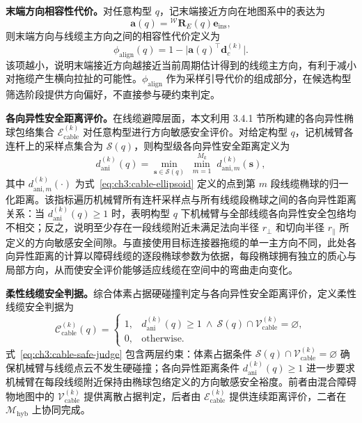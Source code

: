 \textbf{末端方向相容性代价。}对任意构型 $q$，记末端接近方向在地图系中的表达为
\begin{equation}
  \mathbf{a}(q)={}^{\mathcal{W}}\mathbf{R}_E(q)\mathbf{e}_{\mathrm{ins}},
\end{equation}
则末端方向与线缆主方向之间的相容性代价定义为
\begin{equation}
  \phi_{\mathrm{align}}(q)=1-\bigl|\mathbf{a}(q)^\top \mathbf{d}_c^{(k)}\bigr|.
  \label{eq:ch3:cable-align}
\end{equation}
该项越小，说明末端接近方向越接近当前周期估计得到的线缆主方向，有利于减小对拖缆产生横向拉扯的可能性。$\phi_{\mathrm{align}}$ 作为采样引导代价的组成部分，在候选构型筛选阶段提供方向偏好，不直接参与硬约束判定。

\textbf{各向异性安全距离评价。}在线缆避障层面，本文利用 3.4.1 节所构建的各向异性椭球包络集合 $\mathcal{E}_{\mathrm{cable}}^{(k)}$ 对任意构型进行方向敏感安全评价。对给定构型 $q$，记机械臂各连杆上的采样点集合为 $\mathcal{S}(q)$，则构型级各向异性安全距离定义为
\begin{equation}
  d_{\mathrm{ani}}^{(k)}(q)=\min_{\mathbf{s}\in\mathcal{S}(q)}\;\min_{m=1}^{M_k}\;d_{\mathrm{ani},m}^{(k)}(\mathbf{s}),
  \label{eq:ch3:cable-ani-q}
\end{equation}
其中 $d_{\mathrm{ani},m}^{(k)}(\cdot)$ 为式~\eqref{eq:ch3:cable-ellipsoid} 定义的点到第 $m$ 段线缆椭球的归一化距离。该指标遍历机械臂所有连杆采样点与所有线缆段椭球之间的各向异性距离关系：当 $d_{\mathrm{ani}}^{(k)}(q)\ge 1$ 时，表明构型 $q$ 下机械臂与全部线缆各向异性安全包络均不相交；反之，说明至少存在一段线缆附近未满足法向半径 $r_\perp$ 和切向半径 $r_\parallel$ 所定义的方向敏感安全间隙。与直接使用目标连接器拖缆的单一主方向不同，此处各向异性距离的计算以障碍线缆的逐段椭球参数为依据，每段椭球拥有独立的质心与局部方向，从而使安全评价能够适应线缆在空间中的弯曲走向变化。

\textbf{柔性线缆安全判据。}综合体素占据硬碰撞判定与各向异性安全距离评价，定义柔性线缆安全判据为
\begin{equation}
  \mathcal{C}_{\mathrm{cable}}^{(k)}(q)=
  \begin{cases}
    1,& d_{\mathrm{ani}}^{(k)}(q)\ge 1\ \land\ \mathcal{S}(q)\cap\mathcal{V}_{\mathrm{cable}}^{(k)}=\varnothing,\\
    0,& \text{otherwise}.
  \end{cases}
  \label{eq:ch3:cable-safe-judge}
\end{equation}
式~\eqref{eq:ch3:cable-safe-judge} 包含两层约束：体素占据条件 $\mathcal{S}(q)\cap\mathcal{V}_{\mathrm{cable}}^{(k)}=\varnothing$ 确保机械臂与线缆点云不发生硬碰撞；各向异性距离条件 $d_{\mathrm{ani}}^{(k)}(q)\ge 1$ 进一步要求机械臂在每段线缆附近保持由椭球包络定义的方向敏感安全裕度。前者由混合障碍物地图中的 $\mathcal{V}_{\mathrm{cable}}^{(k)}$ 提供离散占据判定，后者由 $\mathcal{E}_{\mathrm{cable}}^{(k)}$ 提供连续距离评价，二者在 $\mathcal{M}_{\mathrm{hyb}}$ 上协同完成。

